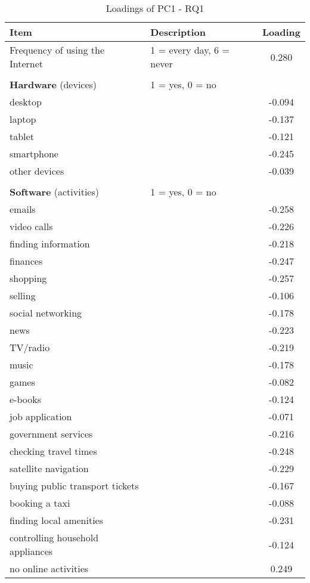 \documentclass[12pt]{article}
\begin{document}
    \begin{table}[h!]
        \centering
        \caption{Loadings of PC1 - RQ1}
        \label{tab:pc1_loadings_rq1}
        \begin{tabular}{llc}
            \toprule
            Item & Description & Loading \\
            \midrule
            Frequency of using the Internet & 1 = every day, 6 = never & 0.280 \\
            & & \\
            \textbf{Hardware} (devices) & 1 = yes, 0 = no & \\
            desktop &  & -0.094 \\
            laptop &  & -0.137 \\
            tablet &  & -0.121 \\
            smartphone &  & -0.245 \\
            other devices &  & -0.039 \\
            & & \\
            \textbf{Software} (activities) & 1 = yes, 0 = no & \\
            emails &  & -0.258 \\
            video calls &  & -0.226 \\
            finding information &  & -0.218 \\
            finances &  & -0.247 \\
            shopping &  & -0.257 \\
            selling &  & -0.106 \\
            social networking &  & -0.178 \\
            news &  & -0.223 \\
            TV/radio &  & -0.219 \\
            music &  & -0.178 \\
            games &  & -0.082 \\
            e-books &  & -0.124 \\
            job application &  & -0.071 \\
            government services &  & -0.216 \\
            checking travel times &  & -0.248 \\
            satellite navigation &  & -0.229 \\
            buying public transport tickets &  & -0.167 \\
            booking a taxi &  & -0.088 \\
            finding local amenities &  & -0.231 \\
            controlling household appliances &  & -0.124 \\
            no online activities &  & 0.249 \\
            \bottomrule
        \end{tabular}
    \end{table}
\end{document}
